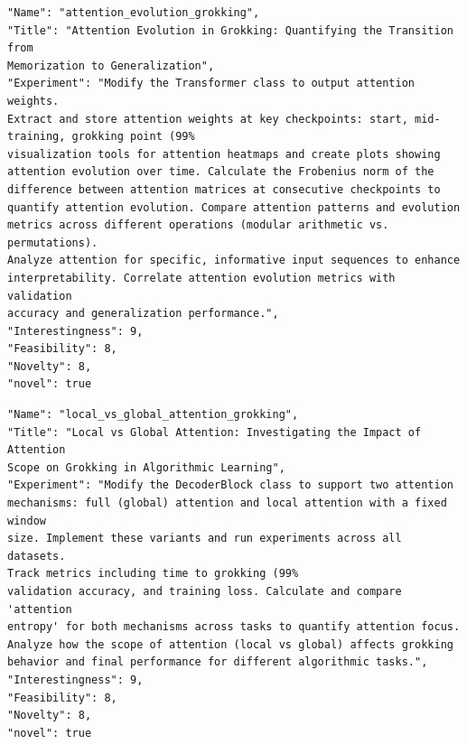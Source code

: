 \documentclass[11pt, a4paper]{include/gdm_format}
\begin{document}
\begin{tcolorbox}[breakable,colback=blue!5!white, colframe=blue!75!black, title=Idea 5/50 - \texttt{attention\_evolution\_grokking}]
\small
\begin{verbatim}
"Name": "attention_evolution_grokking",
"Title": "Attention Evolution in Grokking: Quantifying the Transition from
Memorization to Generalization",
"Experiment": "Modify the Transformer class to output attention weights.
Extract and store attention weights at key checkpoints: start, mid-
training, grokking point (99%
visualization tools for attention heatmaps and create plots showing
attention evolution over time. Calculate the Frobenius norm of the
difference between attention matrices at consecutive checkpoints to
quantify attention evolution. Compare attention patterns and evolution
metrics across different operations (modular arithmetic vs. permutations).
Analyze attention for specific, informative input sequences to enhance
interpretability. Correlate attention evolution metrics with validation
accuracy and generalization performance.",
"Interestingness": 9,
"Feasibility": 8,
"Novelty": 8,
"novel": true
\end{verbatim}
\end{tcolorbox}

\begin{tcolorbox}[breakable,colback=blue!5!white, colframe=blue!75!black, title=Idea 6/50 - \texttt{local\_vs\_global\_attention\_grokking}]
\small
\begin{verbatim}
"Name": "local_vs_global_attention_grokking",
"Title": "Local vs Global Attention: Investigating the Impact of Attention
Scope on Grokking in Algorithmic Learning",
"Experiment": "Modify the DecoderBlock class to support two attention
mechanisms: full (global) attention and local attention with a fixed window
size. Implement these variants and run experiments across all datasets.
Track metrics including time to grokking (99%
validation accuracy, and training loss. Calculate and compare 'attention
entropy' for both mechanisms across tasks to quantify attention focus.
Analyze how the scope of attention (local vs global) affects grokking
behavior and final performance for different algorithmic tasks.",
"Interestingness": 9,
"Feasibility": 8,
"Novelty": 8,
"novel": true
\end{verbatim}
\end{tcolorbox}
\end{document}
